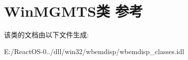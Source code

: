 \hypertarget{class_win_m_g_m_t_s}{}\section{Win\+M\+G\+M\+T\+S类 参考}
\label{class_win_m_g_m_t_s}


该类的文档由以下文件生成\+:\begin{DoxyCompactItemize}
\item 
E\+:/\+React\+O\+S-\/0../dll/win32/wbemdisp/wbemdisp\+\_\+classes.\+idl\end{DoxyCompactItemize}
